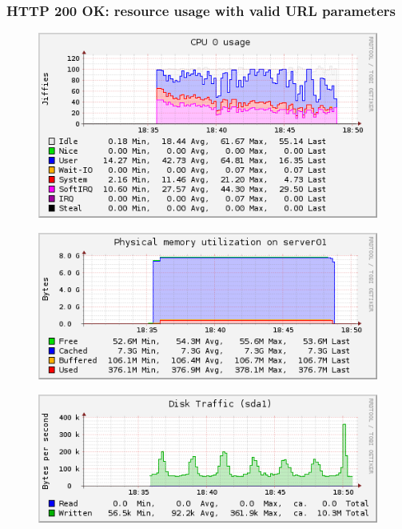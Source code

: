 \documentclass[Measurement results]{subfiles}
\begin{document}
\subsubsection{HTTP 200 OK: resource usage with valid URL parameters}
\begin{figure}[H]
\centering
\includegraphics[scale=0.7]{images/results/200_with_naxsi_incremented_allowed_parameters/cpu.png}
\end{figure}

\begin{figure}[H]
\centering
\includegraphics[scale=0.7]{images/results/200_with_naxsi_incremented_allowed_parameters/memory.png}
\end{figure}

\begin{figure}[H]
\centering
\includegraphics[scale=0.7]{images/results/200_with_naxsi_incremented_allowed_parameters/disk.png}
\end{figure}
\end{document}
